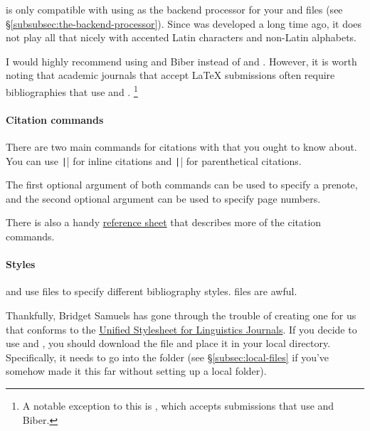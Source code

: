  is only compatible with using  as the backend processor for your  and  files (see \S\ref{subsubsec:the-backend-processor}).
Since  was developed a long time ago, it does not play all that nicely with accented Latin characters and non-Latin alphabets.

I would highly recommend using  and Biber instead of  and .
However, it is worth noting that academic journals that accept \LaTeX{} submissions often require bibliographies that use  and .%
\footnote{%
A notable exception to this is \href{http://semprag.org/}{}, which accepts submissions that use  and Biber.%
}

\paragraph{Citation commands}

There are two main commands for citations with  that you ought to know about.
You can use \texttt|\citet[][]{...}| for inline citations and \texttt|\citep[][]{...}| for parenthetical citations.

The first optional argument of both commands can be used to specify a prenote, and the second optional argument can be used to specify page numbers.

There is also a handy \href{http://merkel.zoneo.net/Latex/natbib.php}{ reference sheet} that describes more of the citation commands.

\paragraph{Styles}

 and  use  files to specify different bibliography styles.
 files are awful.

Thankfully, Bridget Samuels has gone through the trouble of creating one for us that conforms to the \href{http://celxj.org/downloads/UnifiedStyleSheet.pdf}{Unified Stylesheet for Linguistics Journals}.
If you decide to use  and , you should download the file \href{http://celxj.org/downloads/unified.bst}{} and place it in your local  directory.
Specifically, it needs to go into the folder  (see \S\ref{subsec:local-files} if you've somehow made it this far without setting up a local  folder).

